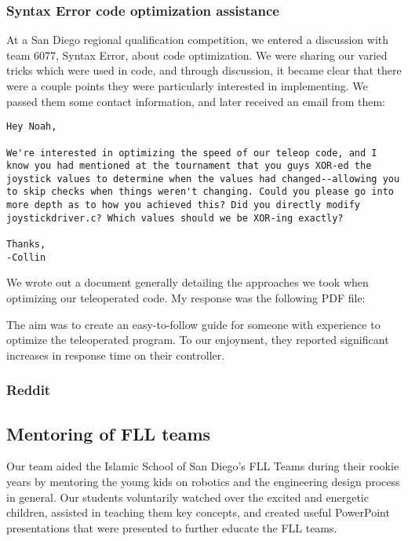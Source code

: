 \subsubsection{Syntax Error code optimization assistance}

At a San Diego regional qualification competition, we entered a discussion with team 6077, Syntax Error, about code optimization. We were sharing our varied tricks which were used in code, and through discussion, it became clear that there were a couple points they were particularly interested in implementing. We passed them some contact information, and later received an email from them:

\begin{lstlisting}
Hey Noah,

We're interested in optimizing the speed of our teleop code, and I know you had mentioned at the tournament that you guys XOR-ed the joystick values to determine when the values had changed--allowing you to skip checks when things weren't changing. Could you please go into more depth as to how you achieved this? Did you directly modify joystickdriver.c? Which values should we be XOR-ing exactly?

Thanks,
-Collin 
\end{lstlisting}

We wrote out a document generally detailing the approaches we took when optimizing our teleoperated code. My response was the following PDF file:



The aim was to create an easy-to-follow guide for someone with experience to optimize the teleoperated program. To our enjoyment, they reported significant increases in response time on their controller.

\subsubsection{Reddit}

\subsection{Mentoring of FLL teams}
Our team aided the Islamic School of San Diego's FLL Teams during their rookie years by mentoring the young kids on robotics and the engineering design process in general. Our students voluntarily watched over the excited and energetic children, assisted in teaching them key concepts, and created useful PowerPoint presentations that were presented to further educate the FLL teams.


